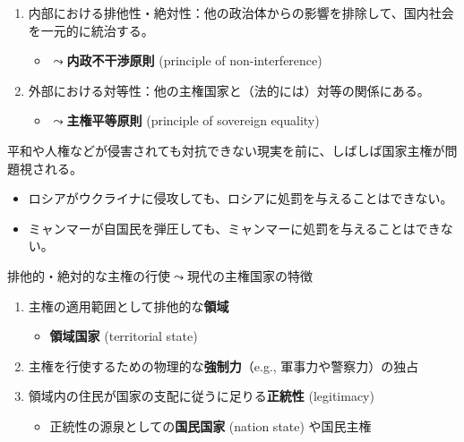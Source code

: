 \documentclass[
  xelatex,
  ja=standard]{bxjsarticle}
\providecommand{\tightlist}{%
  \setlength{\itemsep}{0pt}\setlength{\parskip}{0pt}}\usepackage{longtable,booktabs,array}
\begin{document}
\begin{enumerate}
\def\labelenumi{\arabic{enumi}.}
\tightlist
\item
  内部における排他性・絶対性：他の政治体からの影響を排除して、国内社会を一元的に統治する。

  \begin{itemize}
  \tightlist
  \item
    \(\leadsto\)\textbf{内政不干渉原則} (principle of non-interference)
  \end{itemize}
\item
  外部における対等性：他の主権国家と（法的には）対等の関係にある。

  \begin{itemize}
  \tightlist
  \item
    \(\leadsto\)\textbf{主権平等原則} (principle of sovereign equality)
  \end{itemize}
\end{enumerate}

平和や人権などが侵害されても対抗できない現実を前に、しばしば国家主権が問題視される。

\begin{itemize}
\tightlist
\item
  ロシアがウクライナに侵攻しても、ロシアに処罰を与えることはできない。
\item
  ミャンマーが自国民を弾圧しても、ミャンマーに処罰を与えることはできない。
\end{itemize}

排他的・絶対的な主権の行使\(\leadsto\)現代の主権国家の特徴
\citep{sunahara2020}

\begin{enumerate}
\def\labelenumi{\arabic{enumi}.}
\tightlist
\item
  主権の適用範囲として排他的な\textbf{領域}

  \begin{itemize}
  \tightlist
  \item
    \textbf{領域国家} (territorial state)
  \end{itemize}
\item
  主権を行使するための物理的な\textbf{強制力}（e.g.,
  軍事力や警察力）の独占
\item
  領域内の住民が国家の支配に従うに足りる\textbf{正統性} (legitimacy)

  \begin{itemize}
  \tightlist
  \item
    正統性の源泉としての\textbf{国民国家} (nation state) や国民主権
  \end{itemize}
\end{enumerate}
\end{document}
